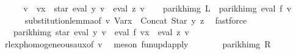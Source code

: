 \begin{isabellebody}
%
\isadelimproof
%
\endisadelimproof
%
\isatagproof
{}\isamarkupfalse%
\ {\isacharminus}{\kern0pt}\isanewline
\ \ \isamarkupfalse%
\ {\isacharquery}{\kern0pt}v{\isacharprime}{\kern0pt}\ {\isacharequal}{\kern0pt}\ {\isachardoublequoteopen}v{\isacharparenleft}{\kern0pt}x\ {\isacharcolon}{\kern0pt}{\isacharequal}{\kern0pt}\ star\ {\isacharparenleft}{\kern0pt}eval\ y\ v{\isacharparenright}{\kern0pt}\ {\isacharat}{\kern0pt}{\isacharat}{\kern0pt}\ eval\ z\ v{\isacharparenright}{\kern0pt}{\isachardoublequoteclose}\isanewline
\ \ \isamarkupfalse%
\ {\isachardoublequoteopen}parikh{\isacharunderscore}{\kern0pt}img\ {\isacharquery}{\kern0pt}L\ {\isacharequal}{\kern0pt}\ parikh{\isacharunderscore}{\kern0pt}img\ {\isacharparenleft}{\kern0pt}eval\ f\ {\isacharquery}{\kern0pt}v{\isacharprime}{\kern0pt}{\isacharparenright}{\kern0pt}{\isachardoublequoteclose}\isanewline
\ \ \ \ \isamarkupfalse%
\ substitution{\isacharunderscore}{\kern0pt}lemma{\isacharbrackleft}{\kern0pt}of\ {\isacharquery}{\kern0pt}v{\isacharprime}{\kern0pt}\ {\isachardoublequoteopen}Var{\isacharparenleft}{\kern0pt}x\ {\isacharcolon}{\kern0pt}{\isacharequal}{\kern0pt}\ Concat\ {\isacharparenleft}{\kern0pt}Star\ y{\isacharparenright}{\kern0pt}\ z{\isacharparenright}{\kern0pt}{\isachardoublequoteclose}{\isacharbrackright}{\kern0pt}\ \isamarkupfalse%
\ fastforce\isanewline
\ \ \isamarkupfalse%
\ \isamarkupfalse%
\ {\isachardoublequoteopen}{\isasymdots}\ {\isasymsubseteq}\ parikh{\isacharunderscore}{\kern0pt}img\ {\isacharparenleft}{\kern0pt}star\ {\isacharparenleft}{\kern0pt}eval\ y\ v{\isacharparenright}{\kern0pt}\ {\isacharat}{\kern0pt}{\isacharat}{\kern0pt}\ eval\ f\ {\isacharparenleft}{\kern0pt}{\isacharquery}{\kern0pt}v{\isacharprime}{\kern0pt}{\isacharparenleft}{\kern0pt}x\ {\isacharcolon}{\kern0pt}{\isacharequal}{\kern0pt}\ eval\ z\ v{\isacharparenright}{\kern0pt}{\isacharparenright}{\kern0pt}{\isacharparenright}{\kern0pt}{\isachardoublequoteclose}\isanewline
\ \ \ \ \isamarkupfalse%
\ rlexp{\isacharunderscore}{\kern0pt}homogeneous{\isacharunderscore}{\kern0pt}aux{\isacharbrackleft}{\kern0pt}of\ {\isacharquery}{\kern0pt}v{\isacharprime}{\kern0pt}{\isacharbrackright}{\kern0pt}\ \isamarkupfalse%
\ {\isacharparenleft}{\kern0pt}meson\ fun{\isacharunderscore}{\kern0pt}upd{\isacharunderscore}{\kern0pt}apply{\isacharparenright}{\kern0pt}\isanewline
\ \ \isamarkupfalse%
\ \isamarkupfalse%
\ {\isachardoublequoteopen}{\isasymdots}\ {\isacharequal}{\kern0pt}\ parikh{\isacharunderscore}{\kern0pt}img\ {\isacharquery}{\kern0pt}R{\isachardoublequoteclose}\ \isamarkupfalse%

\end{isabellebody}
